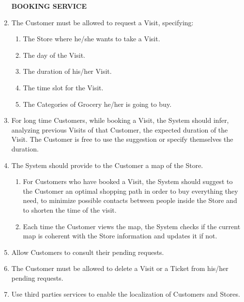 \documentclass[a4paper, 12pt, oneside]{article}
\newcommand*{\lorenzo}[1]{\textcolor{BurntOrange}{#1}}
\newcommand{\yasmin}[1]{\textcolor{Red}{#1}}
\newcommand{\giovanni}[1]{\textcolor{Blue}{#1}}
\begin{document}
\begin{enumerate}[align=left, label={R.\arabic{*}}]
    \item[\textbf{BOOKING SERVICE}]
    \item \label{req:requestVisit}The Customer must be allowed to request a Visit, specifying:
    \begin{enumerate}[label={-}]
        \item \label{req:requestVisit:location}The Store where he/she wants to take a Visit.
        \item \label{req:requestVisit:date}The day of the Visit.
        \item \label{req:requestVisit:duration}The duration of his/her Visit.
        \item \label{req:requestVisit:timeslot}The time slot for the Visit.
        \item \label{req:requestVisit:categoriesToBuy}The Categories of Grocery he/her is going to buy.
    \end{enumerate}
    \item \label{req:statisticForDuration}For long time Customers, while booking a Visit, the System should infer, analyzing previous Visits of that Customer, the expected duration of the Visit. The Customer is free to use the suggestion or specify themselves the duration.
    \item \label{req:sysProvideMap}The System should provide to the Customer a map of the Store.
    \begin{enumerate}[label={-}]
        \item \label{req:sysProvideMap:suggestPath}For Customers who have booked a Visit, the System should suggest to the Customer an optimal shopping path in order to buy everything they need, to minimize possible contacts between people inside the Store and to shorten the time of the visit.
        \item \label{req:sysProvideMap:update} Each time the Customer views the map, the System checks if the current map is coherent with the Store information and updates it if not.
    \end{enumerate}
    \item \label{req:seeRequests}Allow Customers to consult their pending requests.
    \item \label{req:deleteTickOrVis}The Customer must be allowed to delete a Visit or a Ticket from his/her pending requests.
    \item \label{req:thirdPartyGPS}Use third parties services to enable the localization of Customers and Stores. 

\end{enumerate}
\end{document}
